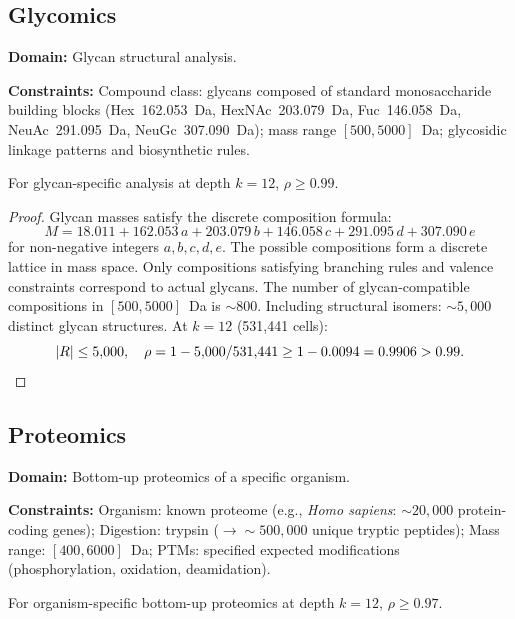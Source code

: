 \subsection{Glycomics}
\label{sec:ch24-glycan}

\noindent\textbf{Domain:} Glycan structural analysis.

\noindent\textbf{Constraints:}
Compound class: glycans composed of standard monosaccharide building blocks
(Hex~162.053~Da, HexNAc~203.079~Da, Fuc~146.058~Da, NeuAc~291.095~Da,
NeuGc~307.090~Da);
mass range $[500, 5000]$~Da;
glycosidic linkage patterns and biosynthetic rules.

\begin{theorem}
\label{thm:ch24-glycan}
For glycan-specific analysis at depth $k = 12$, $\rho \geq 0.99$.
\end{theorem}

\begin{proof}
Glycan masses satisfy the discrete composition formula:
\[
  M = 18.011 + 162.053\,a + 203.079\,b + 146.058\,c + 291.095\,d + 307.090\,e
\]
for non-negative integers $a, b, c, d, e$.  The possible compositions form a
discrete lattice in mass space.  Only compositions satisfying branching rules
and valence constraints correspond to actual glycans.  The number of
glycan-compatible compositions in $[500, 5000]$~Da is $\sim 800$.  Including
structural isomers: $\sim 5{,}000$ distinct glycan structures.  At $k = 12$
(531,441 cells):
\[
  |R| \leq 5{,}000,
  \quad
  \rho = 1 - 5{,}000/531{,}441 \geq 1 - 0.0094 = 0.9906 > 0.99. \qedhere
\]
\end{proof}

\subsection{Proteomics}
\label{sec:ch24-proteo}

\noindent\textbf{Domain:} Bottom-up proteomics of a specific organism.

\noindent\textbf{Constraints:}
Organism: known proteome (e.g., \emph{Homo sapiens}: $\sim 20{,}000$
protein-coding genes);
Digestion: trypsin ($\to \sim 500{,}000$ unique tryptic peptides);
Mass range: $[400, 6000]$~Da;
PTMs: specified expected modifications (phosphorylation, oxidation, deamidation).

\begin{theorem}
\label{thm:ch24-proteo}
For organism-specific bottom-up proteomics at depth $k = 12$,
$\rho \geq 0.97$.
\end{theorem}

